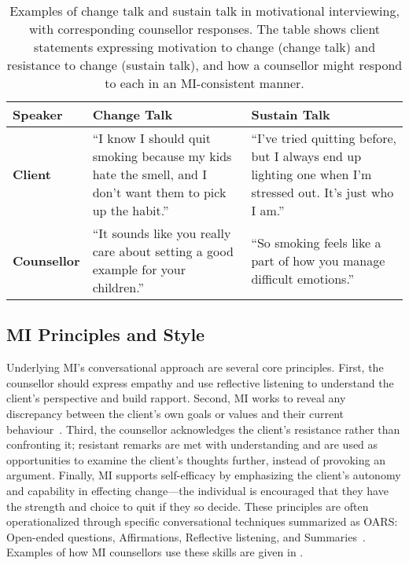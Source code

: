 \begin{table}[ht!]
	\centering
	\begin{tabular}{@{} p{} p{} p{} @{}}
		\toprule
		\textbf{Speaker}                                                                                             & \textbf{Change Talk} & \textbf{Sustain Talk} \\
		\midrule
		\textbf{Client}                                                                                              &
		``I know I should quit smoking because my kids hate the smell, and I don't want them to pick up the habit.'' &
		``I've tried quitting before, but I always end up lighting one when I'm stressed out. It's just who I am.''                                                 \\
		\addlinespace
		\textbf{Counsellor}                                                                                          &
		``It sounds like you really care about setting a good example for your children.''                           &
		``So smoking feels like a part of how you manage difficult emotions.''                                                                                      \\
		\bottomrule
	\end{tabular}
	\caption[Examples of change talk and sustain talk]{Examples of change talk and sustain talk in motivational interviewing, with corresponding counsellor responses. The table shows client statements expressing motivation to change (change talk) and resistance to change (sustain talk), and how a counsellor might respond to each in an MI-consistent manner.}
	\label{tab:change_sustain_talk}
\end{table}



\subsection*{MI Principles and Style}
Underlying MI's conversational approach are several core principles. First, the counsellor should express empathy and use reflective listening to understand the client's perspective and build rapport. Second, MI works to reveal any discrepancy between the client's own goals or values and their current behaviour~\cite{Miller_2023}. Third, the counsellor acknowledges the client's resistance rather than confronting it; resistant remarks are met with understanding and are used as opportunities to examine the client's thoughts further, instead of provoking an argument. Finally, MI supports self-efficacy by emphasizing the client's autonomy and capability in effecting change---the individual is encouraged that they have the strength and choice to quit if they so decide. These principles are often operationalized through specific conversational techniques summarized as OARS: Open-ended questions, Affirmations, Reflective listening, and Summaries~\cite{Rollnick1995}. Examples of how MI counsellors use these skills are given in .


